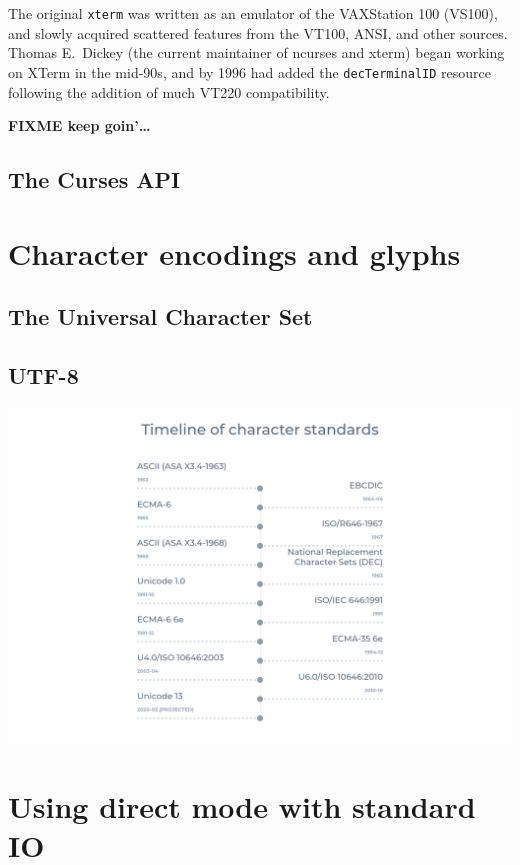 \documentclass[letterpaper,10pt]{article}
\begin{document}
The original \texttt{xterm} was written as an emulator of the VAXStation 100
(VS100), and slowly acquired scattered features from the VT100, ANSI, and other
sources\cite{xtermfaq}. Thomas E.\ Dickey (the current maintainer of \Gls{ncurses}
and xterm) began working on XTerm in the mid-90s, and by 1996 had added the
\texttt{decTerminalID} resource following the addition of much VT220 compatibility.

\textbf{FIXME keep goin'\ldots}

\subsection{The Curses API}
\newpage

\section{Character encodings and glyphs}
\label{section:unicode}
\subsection{The Universal Character Set}
\subsection{UTF-8}

\begin{center}
\includegraphics[width=.9\linewidth]{media/charset-timeline.png}
\end{center}


\newpage

\section{Using direct mode with standard I\/O}
\end{document}
